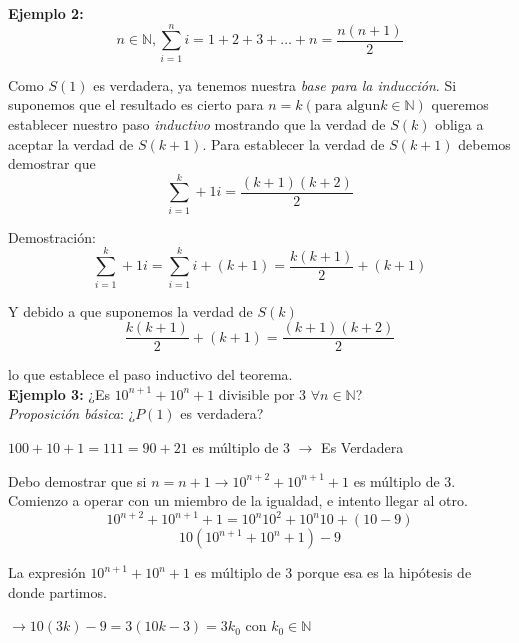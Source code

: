 \textbf{Ejemplo 2:}
\begin{equation*}
	n \in \mathbb{N}, \sum\limits_{i=1}^n i = 1 + 2 + 3 + \dots + n = \frac{n(n+1)}{2}
\end{equation*}

Como $S(1)$ es verdadera, ya tenemos nuestra \emph{base para la inducción}. Si suponemos que el resultado es cierto para
$n=k (\text{para algun} k \in \mathbb{N})$ queremos establecer nuestro paso \emph{inductivo} mostrando que la verdad de $S(k)$ 
obliga a aceptar la verdad de $S(k+1)$.
Para establecer la verdad de $S(k+1)$ debemos demostrar que
\begin{equation*}
	\sum\limits_{i=1}^k+1 i = \frac{(k+1)(k+2)}{2}
\end{equation*}

Demostración:
\begin{equation*}
	\sum\limits_{i=1}^k+1 i = \sum\limits_{i=1}^k i + (k+1) = \frac{k(k+1)}{2} + (k+1)
\end{equation*}

Y debido a que suponemos la verdad de $S(k)$
\begin{equation*}
	\frac{k(k+1)}{2} + (k+1) = \frac{(k+1)(k+2)}{2}
\end{equation*}

lo que establece el paso inductivo del teorema.\\

\textbf{Ejemplo 3:}
¿Es $10^{n+1}+10^{n}+1$ divisible por 3 $\forall n \in \mathbb{N}$?\\

\emph{Proposición básica}: ¿$P(1)$ es verdadera?
\begin{center}
	$100+10+1=111=90+21 $ es múltiplo de 3 $\rightarrow$ Es Verdadera
\end{center}

Debo demostrar que si $n=n+1 \rightarrow 10^{n+2}+10^{n+1}+1$ es múltiplo de 3.\\

Comienzo a operar con un miembro de la igualdad, e intento llegar al otro.
\begin{equation*}
	10^{n+2}+10^{n+1}+1=10^{n}10^{2}+10^{n}10+(10-9)
\end{equation*}
\begin{equation*}
	10(10^{n+1}+10^{n}+1)-9
\end{equation*}

La expresión $10^{n+1}+10^{n}+1$ es múltiplo de 3 porque esa es la hipótesis de donde partimos.

$\rightarrow 10 (3k) - 9 = 3 (10k -3) = 3k_0$ con $k_0 \in \mathbb{N}$

